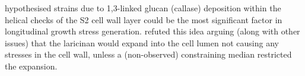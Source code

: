 \cite{brodzki1972} hypothesised strains due to 1,3-linked glucan (callase)
deposition within the helical checks of the S2 cell wall layer could be the
most significant factor in longitudinal growth stress generation. \cite{boyd1977basic}
refuted this idea arguing (along with other issues) that the laricinan would
expand into the cell lumen not causing any stresses in the cell wall, unless a
(non-observed) constraining median restricted the expansion.